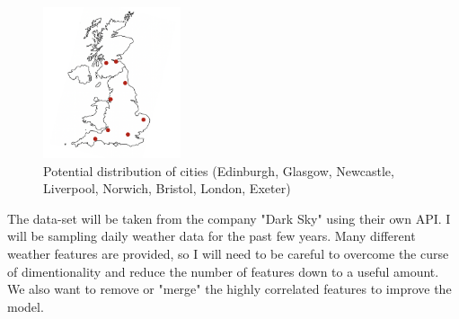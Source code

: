 \documentclass[13pt]{article}
\begin{document}
\begin{figure}[h]
      \centering
      \includegraphics[width = 0.36\textwidth]{images/ukMap.png}
      \caption{Potential distribution of cities (Edinburgh, Glasgow, Newcastle, Liverpool, Norwich, Bristol, London, Exeter)}
      \label{fig:ukMap}
  \end{figure}

The data-set will be taken from the company "Dark Sky" using their own API. I will be sampling daily weather data for the past few years. Many different weather features are provided, so I will need to be careful to overcome the curse of dimentionality and reduce the number of features down to a useful amount. We also want to remove or "merge" the highly correlated features to improve the model.
\end{document}
